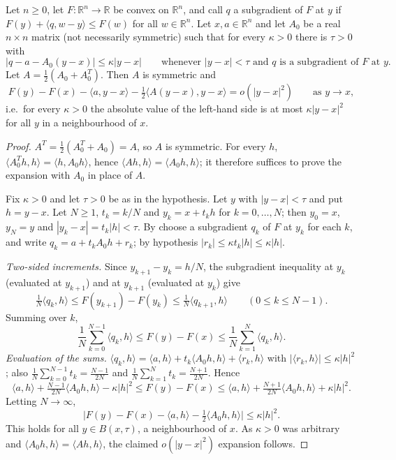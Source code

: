 \begin{lemma}
Let $n\ge0$, let $F:\mathbb R^n\to\mathbb R$ be convex on $\mathbb R^n$, and call $q$ a subgradient of $F$ at $y$ if $F(y)+\langle q,w-y\rangle\le F(w)$ for all $w\in\mathbb R^n$. Let $x,a\in\mathbb R^n$ and let $A_0$ be a real $n\times n$ matrix (not necessarily symmetric) such that for every $\kappa>0$ there is $\tau>0$ with
\[
|q-a-A_0(y-x)|\le\kappa|y-x|\qquad\text{whenever }|y-x|<\tau\text{ and }q\text{ is a subgradient of }F\text{ at }y .
\]
Let $A=\frac12(A_0+A_0^{T})$. Then $A$ is symmetric and
\[
F(y)-F(x)-\langle a,y-x\rangle-\tfrac12\langle A(y-x),y-x\rangle=o(|y-x|^2)\qquad\text{as }y\to x,
\]
i.e.\ for every $\kappa>0$ the absolute value of the left-hand side is at most $\kappa|y-x|^2$ for all $y$ in a neighbourhood of $x$.
\end{lemma}
\begin{proof}
$A^T=\frac12(A_0^T+A_0)=A$, so $A$ is symmetric. For every $h$, $\langle A_0^Th,h\rangle=\langle h,A_0h\rangle$, hence $\langle Ah,h\rangle=\langle A_0h,h\rangle$; it therefore suffices to prove the expansion with $A_0$ in place of $A$.

Fix $\kappa>0$ and let $\tau>0$ be as in the hypothesis. Let $y$ with $|y-x|<\tau$ and put $h=y-x$. Let $N\ge1$, $t_k=k/N$ and $y_k=x+t_kh$ for $k=0,\dots,N$; then $y_0=x$, $y_N=y$ and $|y_k-x|=t_k|h|<\tau$. By  choose a subgradient $q_k$ of $F$ at $y_k$ for each $k$, and write $q_k=a+t_kA_0h+r_k$; by hypothesis $|r_k|\le\kappa t_k|h|\le\kappa|h|$.

\emph{Two-sided increments.} Since $y_{k+1}-y_k=h/N$, the subgradient inequality at $y_k$ (evaluated at $y_{k+1}$) and at $y_{k+1}$ (evaluated at $y_k$) give
\[
\tfrac1N\langle q_k,h\rangle\le F(y_{k+1})-F(y_k)\le\tfrac1N\langle q_{k+1},h\rangle\qquad(0\le k\le N-1).
\]
Summing over $k$,
\[
\frac1N\sum_{k=0}^{N-1}\langle q_k,h\rangle\le F(y)-F(x)\le\frac1N\sum_{k=1}^{N}\langle q_k,h\rangle .
\]
\emph{Evaluation of the sums.} $\langle q_k,h\rangle=\langle a,h\rangle+t_k\langle A_0h,h\rangle+\langle r_k,h\rangle$ with $|\langle r_k,h\rangle|\le\kappa|h|^2$; also $\frac1N\sum_{k=0}^{N-1}t_k=\frac{N-1}{2N}$ and $\frac1N\sum_{k=1}^{N}t_k=\frac{N+1}{2N}$. Hence
\[
\langle a,h\rangle+\tfrac{N-1}{2N}\langle A_0h,h\rangle-\kappa|h|^2\le F(y)-F(x)\le\langle a,h\rangle+\tfrac{N+1}{2N}\langle A_0h,h\rangle+\kappa|h|^2 .
\]
Letting $N\to\infty$,
\[
\bigl|F(y)-F(x)-\langle a,h\rangle-\tfrac12\langle A_0h,h\rangle\bigr|\le\kappa|h|^2 .
\]
This holds for all $y\in B(x,\tau)$, a neighbourhood of $x$. As $\kappa>0$ was arbitrary and $\langle A_0h,h\rangle=\langle Ah,h\rangle$, the claimed $o(|y-x|^2)$ expansion follows.
\end{proof}
